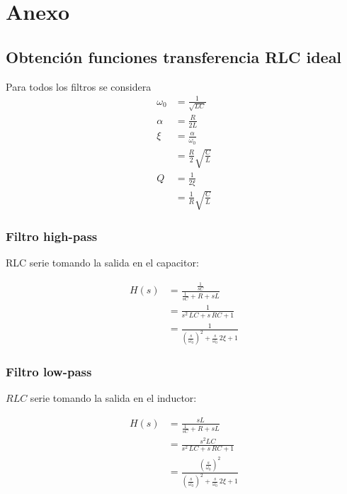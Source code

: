 \newpage
\section{Anexo}

\subsection{Obtenci\'on funciones transferencia RLC ideal}
\label{ssec:ej2_H_rlc_ideal}

Para todos los filtros se considera 
\begin{align*}
\omega_0 &= \frac{1}{\sqrt{LC}}\\
\alpha &=\frac{R}{2L}\\
\xi &= \frac{\alpha}{\omega_0} \\ &= \frac{R}{2}\sqrt{\frac{C}{L}} \\
Q&=\frac{1}{2\xi} \\ &= \frac{1}{R}\sqrt{\frac{C}{L}}
\end{align*}



\subsubsection{Filtro high-pass}

RLC serie tomando la salida en el capacitor:

\begin{align}
H(s)&=\frac{\frac{1}{sC}}{\frac{1}{sC}+R+sL}	\\
&= \frac{1}{s^2 \, LC + s\, RC + 1}	\\
&= \frac{1}{\left(\frac{s}{\omega_0}\right)^2 + \frac{s}{\omega_0}\, 2\xi + 1}
\end{align}


\subsubsection{Filtro low-pass}

$RLC$ serie tomando la salida en el inductor:

\begin{align}
H(s)&=\frac{sL}{\frac{1}{sC}+R+sL}	\\
&= \frac{s^2LC}{s^2 \, LC + s\, RC + 1}	\\
&= \frac{\left(\frac{s}{\omega_0}\right)^2}{\left(\frac{s}{\omega_0}\right)^2 + \frac{s}{\omega_0}\, 2\xi + 1}
\end{align}

